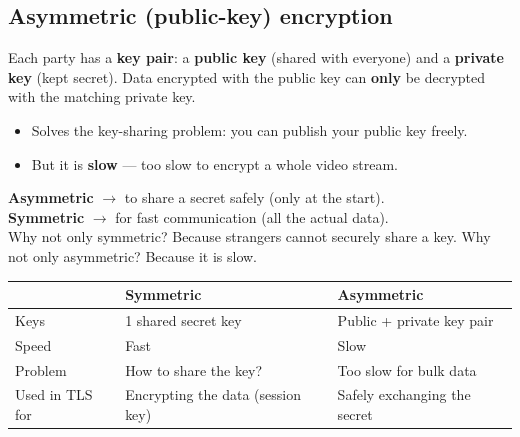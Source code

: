 \subsection{Asymmetric (public-key) encryption}
Each party has a \textbf{key pair}: a \textbf{public key} (shared with everyone) and a \textbf{private key} (kept secret). Data encrypted with the public key can \textbf{only} be decrypted with the matching private key.
\begin{center}
\end{center}
\begin{itemize}
  \item Solves the key-sharing problem: you can publish your public key freely.
  \item But it is \textbf{slow} --- too slow to encrypt a whole video stream.
\end{itemize}

\begin{keyidea}
\textbf{Asymmetric} $\to$ to share a secret safely (only at the start). \\
\textbf{Symmetric} $\to$ for fast communication (all the actual data). \\
Why not only symmetric? Because strangers cannot securely share a key. Why not only asymmetric? Because it is slow.
\end{keyidea}

\begin{center}
\begin{tabular}{lll}
\toprule
 & Symmetric & Asymmetric \\
\midrule
Keys & 1 shared secret key & Public + private key pair \\
Speed & Fast & Slow \\
Problem & How to share the key? & Too slow for bulk data \\
Used in TLS for & Encrypting the data (session key) & Safely exchanging the secret \\
\bottomrule
\end{tabular}
\end{center}

